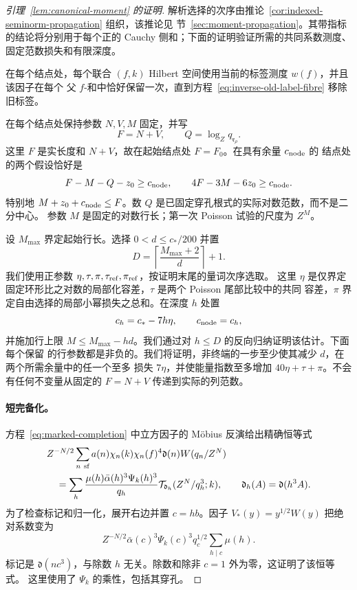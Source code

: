 \documentclass[11pt,a4paper]{article}
\numberwithin{equation}{section}
\numberwithin{figure}{section}
\theoremstyle{definition}
\theoremstyle{remark}
\begin{document}
\begin{proof}[引理~\ref{lem:canonical-moment} 的证明]
解析选择的次序由推论~\ref{cor:indexed-seminorm-propagation} 组织，该推论见
节~\ref{sec:moment-propagation}。其带指标的结论将分别用于每个正的 Cauchy
侧和；下面的证明验证所需的共同系数测度、固定范数损失和有限深度。

在每个结点处，每个联合 \((f,k)\) Hilbert 空间使用当前的标签测度 \(w(f)\)，并且该因子在每个
父 \(f\)-和中恰好保留一次，直到方程~\eqref{eq:inverse-old-label-fibre} 移除旧标签。

在每个结点处保持参数 \(N,V,M\) 固定，并写
\[
 F=N+V,\qquad Q=\log_Zq_{\mathfrak r_\rho}.
\]
这里 \(F\) 是实长度和 \(N+V\)，故在起始结点处 \(F=F_0\)。在具有余量 \(c_{\rm node}\) 的
结点处的两个假设恰好是
\begin{equation}\label{eq:inverse-fixed-invariant}
 F-M-Q-z_0\ge c_{\rm node},\qquad
 4F-3M-6z_0\ge c_{\rm node}.
\end{equation}
特别地 \(M+z_0+c_{\rm node}\le F\)。数 \(Q\) 是已固定穿孔根式的实际对数范数，而不是二分中心。
参数 \(M\) 是固定的对数行长；第一次 Poisson 试验的尺度为 \(Z^M\)。

设 \(M_{\max}\) 界定起始行长。选择 \(0<d\le c_*/200\) 并置
\[
 D=\left\lceil\frac{M_{\max}+2}{d}\right\rceil+1.
\]
我们使用正参数 \(\eta,\tau,\pi,\tau_{\rm ref},\pi_{\rm ref}\)，按证明末尾的量词次序选取。
这里 \(\eta\) 是仅界定固定环形比之对数的局部化容差，\(\tau\) 是两个 Poisson 尾部比较中的共同
容差，\(\pi\) 界定自由选择的局部小幂损失之总和。在深度 \(h\) 处置
\[
 c_h=c_*-7h\eta,\qquad c_{\rm node}=c_h,
\]
并施加行上限 \(M\le M_{\max}-hd\)。我们通过对 \(h\le D\) 的反向归纳证明该估计。下面每个保留
的行参数都是非负的。我们将证明，非终端的一步至少使其减少 \(d\)，在两个所需余量中的任一个至多
损失 \(7\eta\)，并使能量指数至多增加 \(40\eta+\tau+\pi\)。不会有任何不变量从固定的 \(F=N+V\)
传递到实际的列范数。

\paragraph{短完备化。}
方程~\eqref{eq:marked-completion} 中立方因子的 M\"obius 反演给出精确恒等式
\begin{equation}\label{eq:marked-completion-inversion}
 \begin{split}
 &Z^{-N/2}\sum_{n\ {\rm sf}}a(n)\chi_n(k)\chi_n(f)^4
       \mathfrak d(n)W(q_n/Z^N)\\
 &\quad=
 \sum_h\frac{\mu(h)\bar\alpha(h)^3\Psi_k(h)^3}{q_h}
       \mathcal T_{\mathfrak d_h}(Z^N/q_h^3;k),
 \qquad \mathfrak d_h(A)=\mathfrak d(h^3A).
 \end{split}
\end{equation}
为了检查标记和归一化，展开右边并置 \(c=hb\)。因子 \(V_*(y)=y^{1/2}W(y)\) 把绝对系数变为
\[
 Z^{-N/2}\bar\alpha(c)^3\Psi_k(c)^3q_c^{1/2}
       \sum_{h\mid c}\mu(h).
\]
标记是 \(\mathfrak d(nc^3)\)，与除数 \(h\) 无关。除数和除非 \(c=1\) 外为零，这证明了该恒等式。
这里使用了 \(\Psi_k\) 的乘性，包括其穿孔。


\end{proof}
\end{document}
